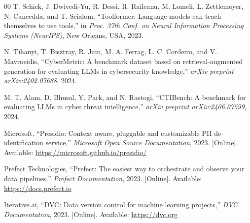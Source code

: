 \documentclass[conference]{IEEEtran}
\begin{document}
\begin{thebibliography}{00}
T. Schick, J. Dwivedi-Yu, R. Dess\`i, R. Raileanu, M. Lomeli,
L. Zettlemoyer, N. Cancedda, and T. Scialom,
``Toolformer: Language models can teach themselves to use tools,''
in \textit{Proc. 37th Conf. on Neural Information Processing Systems
(NeurIPS)},
New Orleans, USA, 2023.

N. Tihanyi, T. Bisztray, R. Jain, M. A. Ferrag, L. C. Cordeiro,
and V. Mavroeidis,
``CyberMetric: A benchmark dataset based on retrieval-augmented
generation for evaluating LLMs in cybersecurity knowledge,''
\textit{arXiv preprint arXiv:2402.07688}, 2024.

M. T. Alam, D. Bhusal, Y. Park, and N. Rastogi,
``CTIBench: A benchmark for evaluating LLMs in cyber threat
intelligence,''
\textit{arXiv preprint arXiv:2406.07599}, 2024.

Microsoft,
``Presidio: Context aware, pluggable and customizable PII
de-identification service,''
\textit{Microsoft Open Source Documentation}, 2023.
[Online]. Available: \url{https://microsoft.github.io/presidio/}

Prefect Technologies,
``Prefect: The easiest way to orchestrate and observe your data
pipelines,''
\textit{Prefect Documentation}, 2023.
[Online]. Available: \url{https://docs.prefect.io}

Iterative.ai,
``DVC: Data version control for machine learning projects,''
\textit{DVC Documentation}, 2023.
[Online]. Available: \url{https://dvc.org}

\end{thebibliography}
\end{document}
